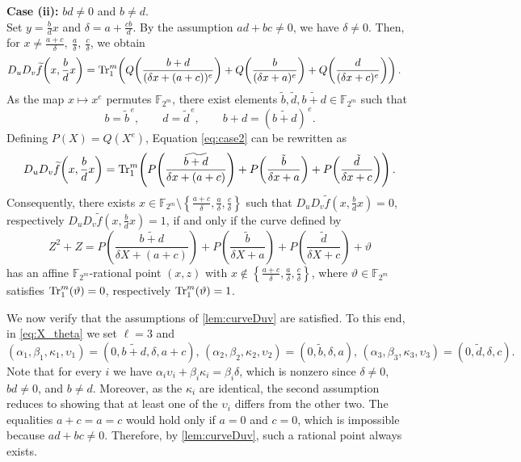 \documentclass[12pt]{article}
\theoremstyle{plain}
\theoremstyle{definition}
\newcommand{\F}{\mathbb{F}}
\newcommand{\Tr}{{\rm Tr}}
\begin{document}
	\noindent \textbf{Case (ii):} $bd\neq 0$ and $b\ne d$.  \\[.3em]
	Set $y=\tfrac{b}{d}x$ and $\delta=a+\tfrac{cb}{d}$.
	By the assumption $ad+bc\neq 0$, we have $\delta\neq 0$.
	Then, for $x\neq \tfrac{a+c}{\delta},\ \tfrac{a}{\delta},\ \tfrac{c}{\delta}$,
	we obtain
	\begin{align}\label{eq:case2}
		D_uD_v\widetilde{f}\!\left(x,\frac{b}{d}x\right)
		&=
		\Tr^m_1\!\left(
		Q\!\left( \frac{b+d}{(\delta x+(a+c))^{e}} \right)
		+
		Q\!\left( \frac{b}{(\delta x+a)^{e}} \right)
		+
		Q\!\left( \frac{d}{(\delta x+c)^{e}} \right)
		\right).
	\end{align}
	As the map $x\mapsto x^e$ permutes $\F_{2^m}$,
	there exist elements
	$\tilde b,\tilde d,\widetilde{b+d}\in\F_{2^m}$ such that
	\[
	b=\tilde b^{\,e},\qquad
	d=\tilde d^{\,e},\qquad
	b+d=\left( \widetilde{b+d}\right)^{\,e}.
	\]
	Defining $P(X)=Q(X^e)$, Equation \eqref{eq:case2} can be rewritten as
	\[
	D_uD_v\widetilde{f}\!\left(x,\frac{b}{d}x\right)
	=
	\Tr^m_1\!\left(
	P\!\left( \frac{\widetilde{b+d}}{\delta x+(a+c)} \right)
	+
	P\!\left( \frac{\tilde b}{\delta x+a} \right)
	+
	P\!\left( \frac{\tilde d}{\delta x+c} \right)
	\right).
	\]
	Consequently, there exists $x\in \F_{2^m}\setminus
	\left\{\tfrac{a+c}{\delta},\tfrac{a}{\delta},\tfrac{c}{\delta}\right\}$
	such that
	$D_uD_v\tilde{f}(x,\frac{b}{d}x)=0$,
	respectively $D_uD_v\tilde{f}(x,\frac{b}{d}x)=1$,
	if and only if the curve defined by
	\[
	Z^2+Z
	=
	P\!\left( \frac{\widetilde{b+d}}{\delta X+(a+c)} \right)
	+
	P\!\left( \frac{\tilde b}{\delta X+a} \right)
	+
	P\!\left( \frac{\tilde d}{\delta X+c} \right)
	+\vartheta
	\]
	has an affine $\F_{2^m}$-rational point $(x,z)$ with $x\notin
	\left\{\tfrac{a+c}{\delta},\tfrac{a}{\delta},\tfrac{c}{\delta}\right\}$,
	where $\vartheta\in\F_{2^m}$ satisfies
	$\Tr^m_1(\vartheta)=0$, respectively $\Tr^m_1(\vartheta)=1$.
	
	
	We now verify that the assumptions of \eqref{lem:curveDuv} are satisfied. 
	To this end, in \eqref{eq:X_theta} we set $\ell=3$ and 
	\[
	(\alpha_1,\beta_1,\kappa_1,\upsilon_1)
	=
	(0,\widetilde{b+d},\delta,a+c), \,
	(\alpha_2,\beta_2,\kappa_2,\upsilon_2)
	=
	(0,\tilde b,\delta,a),
	\,
	(\alpha_3,\beta_3,\kappa_3,\upsilon_3)
	=
	(0,\tilde d,\delta,c).
	\]
	Note that for every $i$ we have $\alpha_i \upsilon_i + \beta_i \kappa_i
	=
	\beta_i \delta$,
	which is nonzero since $\delta \neq 0$, $bd \neq 0$, and $b \neq d$.
	Moreover, as the $\kappa_i$ are identical, the second assumption reduces to showing that at least one of the $\upsilon_i$ differs from the other two. 
	The equalities $a+c = a = c$ would hold only if $a=0$ and $c=0$, which is impossible because $ad + bc \neq 0$.
	Therefore, by \eqref{lem:curveDuv}, such a rational point always exists.
	
\end{document}
